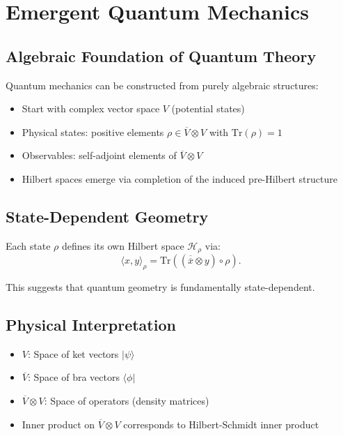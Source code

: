 \documentclass[aps,preprint]{revtex4}
\begin{document}
\section{Emergent Quantum Mechanics}

\subsection{Algebraic Foundation of Quantum Theory}

Quantum mechanics can be constructed from purely algebraic structures:

\begin{itemize}
\item Start with complex vector space $V$ (potential states)

\item Physical states: positive elements $\rho \in \overline{V} \otimes V$
with $\text{Tr}(\rho) = 1$

\item Observables: self-adjoint elements of $\overline{V} \otimes V$

\item Hilbert spaces emerge via completion of the induced pre-Hilbert
structure
\end{itemize}

\subsection{State-Dependent Geometry}

Each state $\rho $ defines its own Hilbert space $\mathcal{H}_{\rho }$ via: 
\begin{equation}
\langle x,y\rangle _{\rho }=\text{Tr}((\overline{\overline{x}}\otimes
y)\circ \rho ).
\end{equation}

This suggests that quantum geometry is fundamentally state-dependent.

\subsection{Physical Interpretation}

\begin{itemize}
\item $V$: Space of ket vectors $|\psi\rangle$

\item $\overline{V}$: Space of bra vectors $\langle\phi|$

\item $\overline{V} \otimes V$: Space of operators (density matrices)

\item Inner product on $\overline{V} \otimes V$ corresponds to
Hilbert-Schmidt inner product
\end{itemize}
\end{document}
